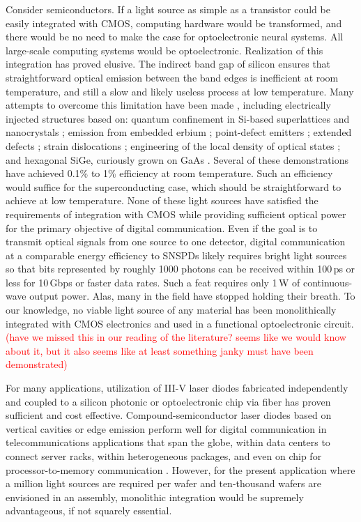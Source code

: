 \documentclass[twocolumn]{article}
\begin{document}
Consider semiconductors. If a light source as simple as a transistor could be easily integrated with CMOS, computing hardware would be transformed, and there would be no need to make the case for optoelectronic neural systems. All large-scale computing systems would be optoelectronic. Realization of this integration has proved elusive. The indirect band gap of silicon ensures that straightforward optical emission between the band edges is inefficient at room temperature, and still a slow and likely useless process at low temperature. Many attempts to overcome this limitation have been made \cite{iyxi1993,shxu2007}, including electrically injected structures based on: quantum confinement in Si-based superlattices \cite{wali2008} and nanocrystals \cite{wabo2005}; emission from embedded erbium \cite{enpo1985,paga1996}; point-defect emitters \cite{brha1986,brbr1989,rosh2007b,bata2007}; extended defects \cite{nglo2001,milo2006}; strain dislocations \cite{kvba2004}; engineering of the local density of optical states \cite{grzh2001}; and hexagonal SiGe, curiously grown on GaAs \cite{Fadaly2020}. Several of these demonstrations have achieved 0.1\% \cite{kvba2004} to 1\% \cite{grzh2001} efficiency at room temperature. Such an efficiency would suffice for the superconducting case, which should be straightforward to achieve at low temperature. None of these light sources have satisfied the requirements of integration with CMOS while providing sufficient optical power for the primary objective of digital communication. Even if the goal is to transmit optical signals from one source to one detector, digital communication at a comparable energy efficiency to SNSPDs likely requires bright light sources so that bits represented by roughly 1000 photons can be received within 100\,ps or less for 10\,Gbps or faster data rates. Such a feat requires only 1\,\textmu W of continuous-wave output power. Alas, many in the field have stopped holding their breath. To our knowledge, no viable light source of any material has been monolithically integrated with CMOS electronics and used in a functional optoelectronic circuit. \textcolor{red}{(have we missed this in our reading of the literature? seems like we would know about it, but it also seems like at least something janky must have been demonstrated)}

For many applications, utilization of III-V laser diodes fabricated independently and coupled to a silicon photonic or optoelectronic chip via fiber has proven sufficient and cost effective. Compound-semiconductor laser diodes based on vertical cavities or edge emission perform well for digital communication in telecommunications applications that span the globe, within data centers to connect server racks, within heterogeneous packages, and even on chip for processor-to-memory communication \cite{suwa2015}. However, for the present application where a million light sources are required per wafer and ten-thousand wafers are envisioned in an assembly, monolithic integration would be supremely advantageous, if not squarely essential. 
\end{document}
